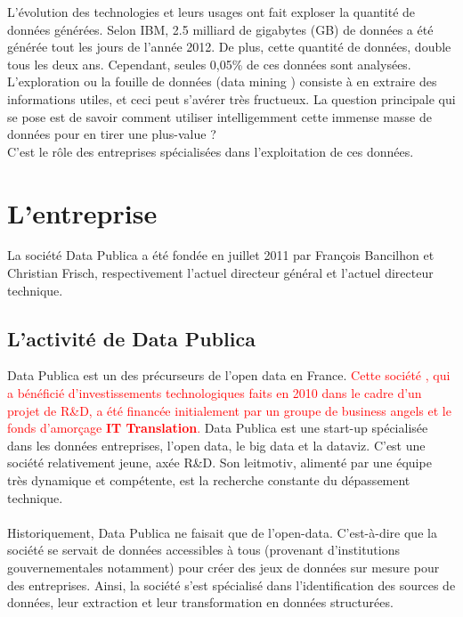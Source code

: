 L’évolution des technologies et leurs usages ont fait exploser la quantité de données générées. Selon IBM, 2.5 milliard de gigabytes (GB) de données a été générée tout les jours de l'année 2012. De plus, cette quantité de données, double tous les deux ans. Cependant, seules 0,05\% de ces données sont analysées.\\

L’exploration ou la fouille de données (\og data mining \fg) consiste à en extraire des informations utiles, et ceci peut s’avérer très fructueux. La question principale qui se pose est de savoir comment utiliser intelligemment cette immense masse de données pour en tirer une plus-value ?\\
C’est le rôle des entreprises spécialisées dans l'exploitation de ces données.

\section{L'entreprise}
    La société Data Publica a été fondée en juillet 2011 par François Bancilhon et Christian Frisch, respectivement l'actuel directeur général et l'actuel directeur technique.

    \subsection{L'activité de Data Publica}
        Data Publica est un des précurseurs de l'open data en France. \textcolor{red}{Cette société , qui a bénéficié d’investissements technologiques faits en 2010 dans le cadre d’un projet de R\&D, a été financée initialement par un groupe de business angels et le fonds d’amorçage \textbf{IT Translation}.}
        Data Publica est une start-up spécialisée dans les données entreprises, l'open data, le big data et la dataviz. C'est une société relativement jeune, axée R\&D. Son leitmotiv, alimenté par une équipe très dynamique et compétente, est la recherche constante du dépassement technique.

        \paragraph{}
            Historiquement, Data Publica ne faisait que de l'open-data. C'est-à-dire que la société se servait de données accessibles à tous (provenant d'institutions gouvernementales notamment) pour créer des jeux de données sur mesure pour des entreprises. Ainsi, la société s'est spécialisé dans l'identification des sources de données, leur extraction et leur transformation en données structurées.


